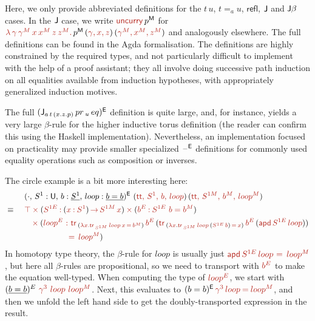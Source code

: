 \documentclass[a4paper,UKenglish]{lipics-v2018}
\newcommand{\U}{\mathsf{U}}
\newcommand{\ra}{\rightarrow}
\newcommand{\blank}{\mathord{\hspace{1pt}\text{--}\hspace{1pt}}} %
\newcommand{\M}{\mathsf{M}}
\newcommand{\refl}{\mathsf{refl}}
\newcommand{\1}{\mathsf{1}} \renewcommand{\Pr}{\mathsf{Pr}}
\renewcommand{\in}{\mathbin{\hat:}}
\renewcommand{\hat}[1]{{\color{BrickRed}{#1}}}
\newcommand{\timesh}{\mathbin{\hat\times}}
\newcommand{\eqh}{\mathbin{\hat=}}
\newcommand{\TR}{\hat{\mathsf{tr}}}
\newcommand{\apd}{\hat{\mathsf{apd}}}
\renewcommand{\tt}{\hat{\mathsf{tt}}}
\begin{document}
Here, we only provide abbreviated definitions for the $t\,u$, $t=_a
u$, $\refl$, $\mathsf{J}$ and $\mathsf{J}\beta$ cases. In the $\mathsf{J}$ case, we write
$\hat{\mathsf{uncurry}}\,p^\M$ for
$\hat{\lambda\,\gamma\,\gamma^M\,x\,x^M\,z\,z^M.}\,p^\M\,(\hat{\gamma,x,z})\,(\hat{\gamma^M,x^M,z^M})$
and analogously elsewhere. The full definitions can be found in the
Agda formalisation. The definitions are highly constrained by the
required types, and not particularly difficult to implement with the
help of a proof assistant; they all involve doing successive path
induction on all equalities available from induction hypotheses, with
appropriately generalized induction motives.

The full $(\mathsf{J}_{a\,t\,(x.z.p)}\,pr\,_u\,eq)^{\mathsf{E}}$ definition is quite
large, and, for instance, yields a very large $\beta$-rule for the
higher inductive torus definition (the reader can confirm this using
the Haskell implementation). Nevertheless, an implementation focused
on practicality may provide smaller specialized $\blank^\E$ definitions for
commonly used equality operations such as composition or inverses.

The circle example is a bit more interesting here:
\begin{alignat*}{5}
  & && (\cdot,\,S^1 : \U,\,b:\underline{S^1},\,loop: \underline{b=b})^\E\,\,(\hat{\tt,\,S^1,\,b,\,loop})\,(\hat{\tt,\,S^{1M},\,b^M,\,loop^M}) \\
  & \equiv \,\, && \hat{\top}\timesh(\hat{S^{1E}}\in (\hat{x}\in\hat{S^1})\hat{\,\ra\,}\hat{S^{1M}\,x})\timesh(\hat{b^E}\in \hat{S^{1E}\,\,b = b^M})\\
  & && \hspace{0.75em}\timesh(\hat{loop^E\,\,\in\,\,} \TR\,_{(\hat{\lambda x. \TR\,_{S^{1M}}\,loop\,x\,=\,b^M})}\,\hat{b^E}\,(\TR\,_{(\hat{\lambda} \hat{x}. \TR\,_{\hat{S^{1M}}}\,\hat{loop}\,(\hat{S^{1E}\,b})\,\eqh\,\hat{x})}\,\hat{b^E}\,(\apd\,\hat{S^{1E}\,loop}))\,\\
  & && \hspace{5.5em} \hat{=\,loop^M})
\end{alignat*}
In homotopy type theory, the $\beta$-rule for $loop$ is usually just
$\apd\,\hat{S^{1E}\,loop}\,\hat{\,=\,loop^M}$, but here all
$\beta$-rules are propositional, so we need to transport with
$\hat{b^E}$ to make the equation well-typed. When computing the type
of $\hat{loop^E}$, we start with $(\underline{b
  =b})^E\,\,\hat{\gamma^3}\,\,\hat{loop}\,\,\hat{loop^M}$. Next, this
evaluates to $(b=b)^\E\,\hat{\gamma^3}\,\hat{loop}\eqh\hat{loop^M}$,
and then we unfold the left hand side to get the doubly-transported
expression in the result.
\end{document}
